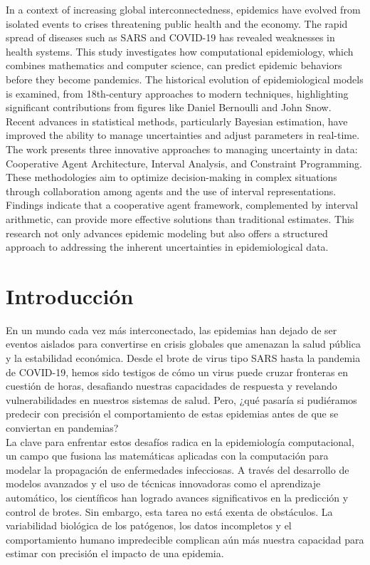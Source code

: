 \documentclass{article}
\begin{document}
In a context of increasing global interconnectedness, epidemics have evolved from isolated events to crises threatening public health and the economy. The rapid spread of diseases such as SARS and COVID-19 has revealed weaknesses in health systems. This study investigates how computational epidemiology, which combines mathematics and computer science, can predict epidemic behaviors before they become pandemics.
The historical evolution of epidemiological models is examined, from 18th-century approaches to modern techniques, highlighting significant contributions from figures like Daniel Bernoulli and John Snow. Recent advances in statistical methods, particularly Bayesian estimation, have improved the ability to manage uncertainties and adjust parameters in real-time.
The work presents three innovative approaches to managing uncertainty in data: Cooperative Agent Architecture, Interval Analysis, and Constraint Programming. These methodologies aim to optimize decision-making in complex situations through collaboration among agents and the use of interval representations. Findings indicate that a cooperative agent framework, complemented by interval arithmetic, can provide more effective solutions than traditional estimates. This research not only advances epidemic modeling but also offers a structured approach to addressing the inherent uncertainties in epidemiological data.

\newpage

\section*{Introducción}
\label{sec:12}

En un mundo cada vez más interconectado, las epidemias han dejado de ser eventos aislados para convertirse en crisis globales que amenazan la salud pública y la estabilidad económica. Desde el brote de virus tipo SARS hasta la pandemia de COVID-19, hemos sido testigos de cómo un virus puede cruzar fronteras en cuestión de horas, desafiando nuestras capacidades de respuesta y revelando vulnerabilidades en nuestros sistemas de salud. Pero, ¿qué pasaría si pudiéramos predecir con precisión el comportamiento de estas epidemias antes de que se conviertan en pandemias? \\

La clave para enfrentar estos desafíos radica en la epidemiología computacional, un campo que fusiona las matemáticas aplicadas con la computación para modelar la propagación de enfermedades infecciosas. A través del desarrollo de modelos avanzados y el uso de técnicas innovadoras como el aprendizaje automático, los científicos han logrado avances significativos en la predicción y control de brotes. Sin embargo, esta tarea no está exenta de obstáculos. La variabilidad biológica de los patógenos, los datos incompletos y el comportamiento humano impredecible complican aún más nuestra capacidad para estimar con precisión el impacto de una epidemia. \\
\end{document}
